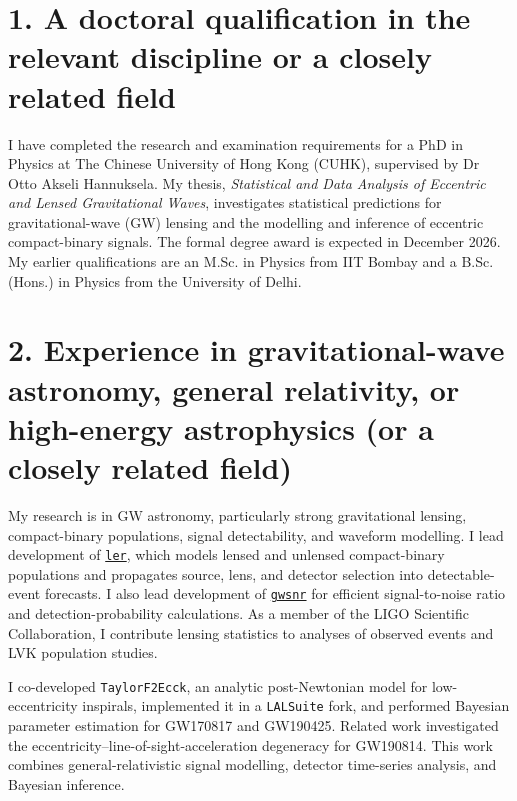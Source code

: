 \documentclass[10pt]{article}
\newcommand{\firstheading}[2]{\thispagestyle{plain}{\LARGE\bfseries\color{accent}#1}\par\vspace{3pt}{#2}\par\vspace{4pt}{\color{accent}\hrule}\vspace{8pt}}
\begin{document}
\firstheading{Response to key selection criteria}{Phurailatpam Hemantakumar\quad|\quad Research Fellow -- Gravitational Wave Discovery (OzGrav)\\Monash University, Job No. 698908\quad|\quad 21 November 2026}

\section*{1. A doctoral qualification in the relevant discipline or a closely related field}
I have completed the research and examination requirements for a PhD in Physics at The Chinese University of Hong Kong (CUHK), supervised by Dr Otto Akseli Hannuksela. My thesis, \textit{Statistical and Data Analysis of Eccentric and Lensed Gravitational Waves}, investigates statistical predictions for gravitational-wave (GW) lensing and the modelling and inference of eccentric compact-binary signals. The formal degree award is expected in December 2026. My earlier qualifications are an M.Sc. in Physics from IIT Bombay and a B.Sc. (Hons.) in Physics from the University of Delhi.

\section*{2. Experience in gravitational-wave astronomy, general relativity, or high-energy astrophysics (or a closely related field)}
My research is in GW astronomy, particularly strong gravitational lensing, compact-binary populations, signal detectability, and waveform modelling. I lead development of \href{https://ler.hemantaph.com/}{\texttt{ler}}, which models lensed and unlensed compact-binary populations and propagates source, lens, and detector selection into detectable-event forecasts. I also lead development of \href{https://gwsnr.hemantaph.com/}{\texttt{gwsnr}} for efficient signal-to-noise ratio and detection-probability calculations. As a member of the LIGO Scientific Collaboration, I contribute lensing statistics to analyses of observed events and LVK population studies.

I co-developed \texttt{TaylorF2Ecck}, an analytic post-Newtonian model for low-eccentricity inspirals, implemented it in a \texttt{LALSuite} fork, and performed Bayesian parameter estimation for GW170817 and GW190425. Related work investigated the eccentricity--line-of-sight-acceleration degeneracy for GW190814. This work combines general-relativistic signal modelling, detector time-series analysis, and Bayesian inference.
\end{document}

